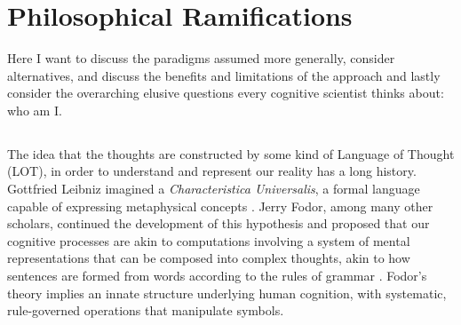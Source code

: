 \chapter{Philosophical Ramifications}
Here I want to discuss the paradigms assumed more generally, consider alternatives, and discuss the benefits and limitations of the approach and lastly consider the overarching elusive questions every cognitive scientist thinks about: who am I.

\section{}

The idea that the thoughts are constructed by some kind of Language of Thought (LOT), in order to understand and represent our reality has a long history. 
Gottfried Leibniz imagined a \textit{Characteristica Universalis}, a formal language capable of expressing metaphysical concepts \cite{sep-leibniz-logic-influence}.
Jerry Fodor, among many other scholars, continued the development of this hypothesis and proposed that our cognitive processes are akin to computations involving a system of mental representations that can be composed into complex thoughts, akin to how sentences are formed from words according to the rules of grammar \cite{sep-language-thought}. Fodor's theory implies an innate structure underlying human cognition, with systematic, rule-governed operations that manipulate symbols.

